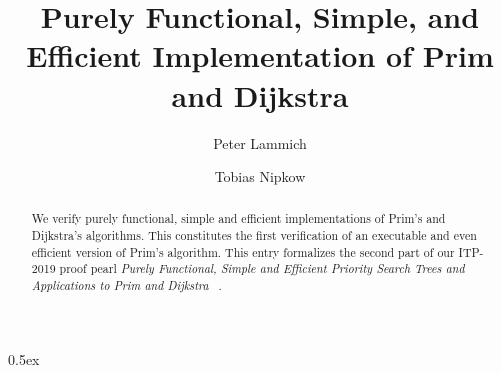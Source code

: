 \documentclass[11pt,a4paper,notitlepage]{report}
\begin{document}
\title{Purely Functional, Simple, and Efficient Implementation of Prim and Dijkstra}
\author{Peter Lammich \and Tobias Nipkow}
\maketitle

\begin{abstract}
We verify purely functional, simple and efficient implementations of Prim's and Dijkstra's algorithms.
This constitutes the first verification of an executable and even efficient version of Prim's algorithm.
This entry formalizes the second part of our ITP-2019 proof
pearl \emph{Purely Functional, Simple and Efficient Priority Search Trees and Applications to Prim and Dijkstra}
~\cite{LaNi19}.
\end{abstract}

\clearpage
\tableofcontents

\parindent 0pt\parskip 0.5ex



\clearpage


\end{document}
